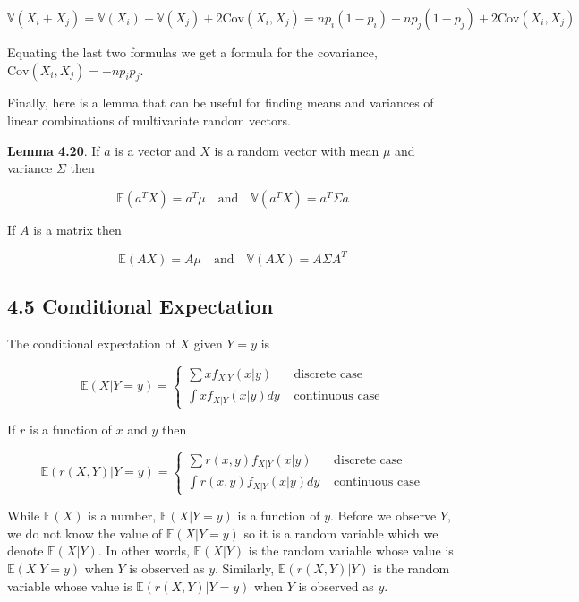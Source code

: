 \[ \mathbb{V}(X_{i} + X_{j}) = \mathbb{V}(X_{i}) + \mathbb{V}(X_{j}) + 2 \text{Cov}(X_{i}, X_{j}) =  np_{i}(1 - p_{i}) + np_{j}(1 - p_{j}) + 2 \text{Cov}(X_{i}, X_{j}) \]

Equating the last two formulas we get a formula for the covariance,
\(\text{Cov}(X_{i}, X_{j}) = -np_{i}p_{j}\).

Finally, here is a lemma that can be useful for finding means and
variances of linear combinations of multivariate random vectors.

\textbf{Lemma 4.20}. If \(a\) is a vector and \(X\) is a random vector
with mean \(\mu\) and variance \(\Sigma\) then

\[ \mathbb{E}(a^T X) = a^T \mu
\quad \text{and} \quad
\mathbb{V}(a^T X) = a^T \Sigma a \]

If \(A\) is a matrix then

\[ \mathbb{E}(A X) = A \mu
\quad \text{and} \quad
\mathbb{V}(AX) = A \Sigma A^T \]

\subsection*{4.5 Conditional
Expectation}\label{conditional-expectation}

The conditional expectation of \(X\) given \(Y = y\) is

\[ \mathbb{E}(X | Y = y) = \begin{cases}
\sum x f_{X | Y}(x | y) &\text{ discrete case} \\
\int x f_{X | Y}(x | y) dy &\text{ continuous case}
\end{cases}
\]

If \(r\) is a function of \(x\) and \(y\) then

\[ \mathbb{E}(r(X, Y) | Y = y) = \begin{cases}
\sum r(x, y) f_{X | Y}(x | y) &\text{ discrete case} \\
\int r(x, y) f_{X | Y}(x | y) dy &\text{ continuous case}
\end{cases}
\]

While \(\mathbb{E}(X)\) is a number, \(\mathbb{E}(X | Y = y)\) is a
function of \(y\). Before we observe \(Y\), we do not know the value of
\(\mathbb{E}(X | Y = y)\) so it is a random variable which we denote
\(\mathbb{E}(X | Y)\). In other words, \(\mathbb{E}(X | Y)\) is the
random variable whose value is \(\mathbb{E}(X | Y = y)\) when \(Y\) is
observed as \(y\). Similarly, \(\mathbb{E}(r(X, Y) | Y)\) is the random
variable whose value is \(\mathbb{E}(r(X, Y) | Y = y)\) when \(Y\) is
observed as \(y\).

